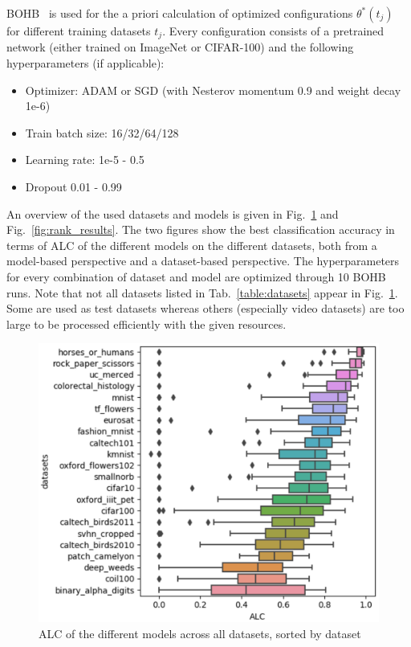 \documentclass{article}
\begin{document}
BOHB~\cite{falkner18} is used for the a priori calculation of optimized configurations $\theta^*(t_j)$ for different training datasets $t_j$. Every configuration consists of a pretrained network (either trained on ImageNet or CIFAR-100) and the following hyperparameters (if applicable):
%
\begin{itemize}
\item Optimizer: ADAM or SGD (with Nesterov momentum 0.9 and weight decay 1e-6)
\item Train batch size: 16/32/64/128
\item Learning rate: 1e-5 - 0.5
\item Dropout 0.01 - 0.99
\end{itemize}
%
An overview of the used datasets and models is given in Fig.~\ref{fig:dataset_results} and Fig.~\ref{fig:rank_results}. The two figures show the best classification accuracy in terms of ALC of the different models on the different datasets, both from a model-based perspective and a dataset-based perspective. The hyperparameters for every combination of dataset and model are optimized through 10 BOHB runs. Note that not all datasets listed in Tab.~\ref{table:datasets} appear in Fig.~\ref{fig:dataset_results}. Some are used as test datasets whereas others (especially video datasets) are too large to be processed efficiently with the given resources.

\begin{figure}[htb]
\begin{center}
 	\includegraphics[width=0.85\linewidth]{../figures/dataset_results.eps} 
\end{center}
\caption{ALC of the different models across all datasets, sorted by dataset}
\label{fig:dataset_results}
\end{figure} 
\end{document}
